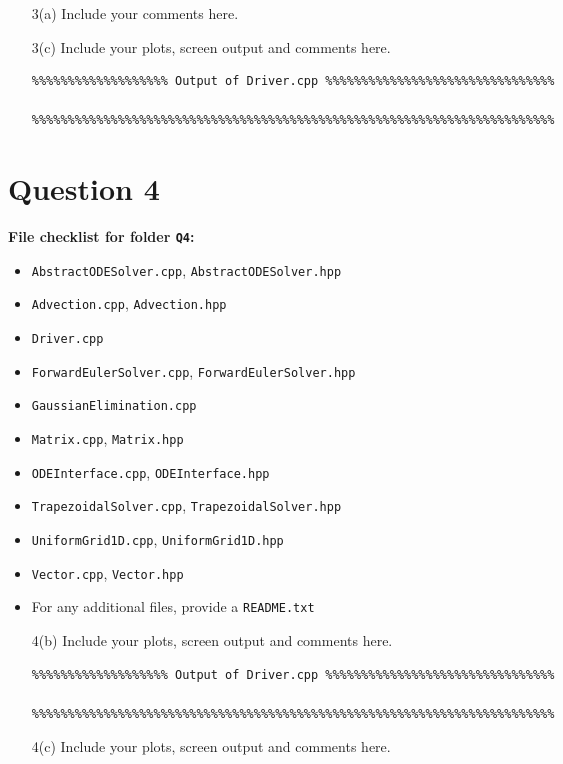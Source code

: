 \documentclass[a4,10pt,fleqn]{article}  %
\newcommand{\il}[1]{\texttt{#1}}
\begin{document}
\vspace{10mm}
\begin{itemize}

\item[3(a)] Include your comments here.

\item[3(c)] Include your plots, screen output and comments here.

\begin{verbatim}
%%%%%%%%%%%%%%%%%%% Output of Driver.cpp %%%%%%%%%%%%%%%%%%%%%%%%%%%%%%%%

%%%%%%%%%%%%%%%%%%%%%%%%%%%%%%%%%%%%%%%%%%%%%%%%%%%%%%%%%%%%%%%%%%%%%%%%%
\end{verbatim}

\end{itemize}

\clearpage

\section*{Question 4}

\textbf{File checklist for folder \il{Q4}:}
\begin{itemize}
  \item \il{AbstractODESolver.cpp}, \il{AbstractODESolver.hpp}
  \item \il{Advection.cpp}, \il{Advection.hpp}
  \item \il{Driver.cpp}
  \item \il{ForwardEulerSolver.cpp}, \il{ForwardEulerSolver.hpp}
  \item \il{GaussianElimination.cpp}
  \item \il{Matrix.cpp}, \il{Matrix.hpp}
  \item \il{ODEInterface.cpp}, \il{ODEInterface.hpp}
  \item \il{TrapezoidalSolver.cpp}, \il{TrapezoidalSolver.hpp}
  \item \il{UniformGrid1D.cpp}, \il{UniformGrid1D.hpp}
  \item \il{Vector.cpp}, \il{Vector.hpp}
  \item For any additional files, provide a \il{README.txt}
\end{itemize}

\vspace{10mm}
\begin{itemize}

\item[4(b)] Include your plots, screen output and comments here.

\begin{verbatim}
%%%%%%%%%%%%%%%%%%% Output of Driver.cpp %%%%%%%%%%%%%%%%%%%%%%%%%%%%%%%%

%%%%%%%%%%%%%%%%%%%%%%%%%%%%%%%%%%%%%%%%%%%%%%%%%%%%%%%%%%%%%%%%%%%%%%%%%
\end{verbatim}

\item[4(c)] Include your plots, screen output and comments here.

\end{itemize}
\end{document}
